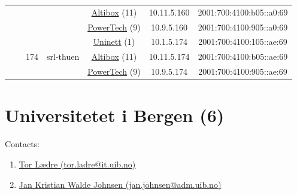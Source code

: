 \begin{small}
\begin{center}
\begin{longtable}{|c|c|c|c|c|c|c|c|}
  &  &  &  & \multicolumn{2}{|c|}{\tiny{\href{https://www.altibox.no}{Altibox} (11)}} & \tiny{10.11.5.160} & \tiny{2001:700:4100:b05::a0:69} \\* \cline{5-5}\cline{6-6}\cline{7-7}\cline{8-8}
  &  &  &  & \multicolumn{2}{|c|}{\tiny{\href{http://www.powertech.no}{PowerTech} (9)}} & \tiny{10.9.5.160} & \tiny{2001:700:4100:905::a0:69} \\* \cline{3-3}\cline{4-4}\cline{5-5}\cline{6-6}\cline{7-7}\cline{8-8}
  &  & \multirow{3}{*}{\tiny{174}} & \multicolumn{1}{|l|}{\multirow{3}{*}{\tiny{srl-thuen}}} & \multicolumn{2}{|c|}{\tiny{\href{https://www.uninett.no}{Uninett} (1)}} & \tiny{10.1.5.174} & \tiny{2001:700:4100:105::ae:69} \\* \cline{5-5}\cline{6-6}\cline{7-7}\cline{8-8}
  &  &  &  & \multicolumn{2}{|c|}{\tiny{\href{https://www.altibox.no}{Altibox} (11)}} & \tiny{10.11.5.174} & \tiny{2001:700:4100:b05::ae:69} \\* \cline{5-5}\cline{6-6}\cline{7-7}\cline{8-8}
  &  &  &  & \multicolumn{2}{|c|}{\tiny{\href{http://www.powertech.no}{PowerTech} (9)}} & \tiny{10.9.5.174} & \tiny{2001:700:4100:905::ae:69} \\ \hline
\end{longtable}
\end{center}
\end{small}



\section{Universitetet i Bergen (6)}
\label{sec:UiB}

Contacts:
\begin{enumerate}
 \item {}\href{mailto:tor.ladre@it.uib.no}{Tor Lædre (tor.ladre@it.uib.no)}
 \item {}\href{mailto:jan.johnsen@adm.uib.no}{Jan Kristian Walde Johnsen (jan.johnsen@adm.uib.no)}
\end{enumerate}

